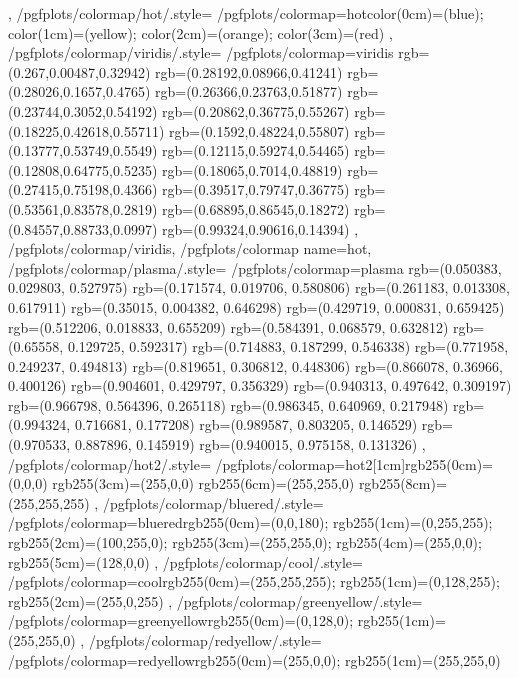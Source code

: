 {{	},
	/pgfplots/colormap/hot/.style={
		/pgfplots/colormap={hot}{color(0cm)=(blue); color(1cm)=(yellow); color(2cm)=(orange); color(3cm)=(red)}
	},
	/pgfplots/colormap/viridis/.style={%
		/pgfplots/colormap={viridis}{%
			rgb=(0.267,0.00487,0.32942)
			rgb=(0.28192,0.08966,0.41241)
			rgb=(0.28026,0.1657,0.4765)
			rgb=(0.26366,0.23763,0.51877)
			rgb=(0.23744,0.3052,0.54192)
			rgb=(0.20862,0.36775,0.55267)
			rgb=(0.18225,0.42618,0.55711)
			rgb=(0.1592,0.48224,0.55807)
			rgb=(0.13777,0.53749,0.5549)
			rgb=(0.12115,0.59274,0.54465)
			rgb=(0.12808,0.64775,0.5235)
			rgb=(0.18065,0.7014,0.48819)
			rgb=(0.27415,0.75198,0.4366)
			rgb=(0.39517,0.79747,0.36775)
			rgb=(0.53561,0.83578,0.2819)
			rgb=(0.68895,0.86545,0.18272)
			rgb=(0.84557,0.88733,0.0997)
			rgb=(0.99324,0.90616,0.14394)
		}%
	},
	/pgfplots/colormap/viridis,
	/pgfplots/colormap name=hot,
	/pgfplots/colormap/plasma/.style={%
		/pgfplots/colormap={plasma}{%
			rgb=(0.050383, 0.029803, 0.527975)
			rgb=(0.171574, 0.019706, 0.580806)
			rgb=(0.261183, 0.013308, 0.617911)
			rgb=(0.35015, 0.004382, 0.646298)
			rgb=(0.429719, 0.000831, 0.659425)
			rgb=(0.512206, 0.018833, 0.655209)
			rgb=(0.584391, 0.068579, 0.632812)
			rgb=(0.65558, 0.129725, 0.592317)
			rgb=(0.714883, 0.187299, 0.546338)
			rgb=(0.771958, 0.249237, 0.494813)
			rgb=(0.819651, 0.306812, 0.448306)
			rgb=(0.866078, 0.36966, 0.400126)
			rgb=(0.904601, 0.429797, 0.356329)
			rgb=(0.940313, 0.497642, 0.309197)
			rgb=(0.966798, 0.564396, 0.265118)
			rgb=(0.986345, 0.640969, 0.217948)
			rgb=(0.994324, 0.716681, 0.177208)
			rgb=(0.989587, 0.803205, 0.146529)
			rgb=(0.970533, 0.887896, 0.145919)
			rgb=(0.940015, 0.975158, 0.131326)
		}%
	},
 	/pgfplots/colormap/hot2/.style={
 		/pgfplots/colormap={hot2}{[1cm]rgb255(0cm)=(0,0,0) rgb255(3cm)=(255,0,0) rgb255(6cm)=(255,255,0) rgb255(8cm)=(255,255,255)}
 	},
	/pgfplots/colormap/bluered/.style={
		/pgfplots/colormap={bluered}{rgb255(0cm)=(0,0,180); rgb255(1cm)=(0,255,255); rgb255(2cm)=(100,255,0); rgb255(3cm)=(255,255,0); rgb255(4cm)=(255,0,0); rgb255(5cm)=(128,0,0)}
	},
	/pgfplots/colormap/cool/.style={
		/pgfplots/colormap={cool}{rgb255(0cm)=(255,255,255); rgb255(1cm)=(0,128,255); rgb255(2cm)=(255,0,255)}
	},
	/pgfplots/colormap/greenyellow/.style={
		/pgfplots/colormap={greenyellow}{rgb255(0cm)=(0,128,0); rgb255(1cm)=(255,255,0)}
	},
	/pgfplots/colormap/redyellow/.style={
		/pgfplots/colormap={redyellow}{rgb255(0cm)=(255,0,0); rgb255(1cm)=(255,255,0)}
}}
